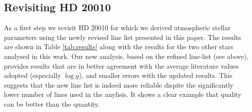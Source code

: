 \documentclass[a4paper,fleqn,usenatbib]{mnras}
\begin{document}
\subsection{Revisiting HD 20010}
\label{sec:hd20010}

As a first step we revisit HD 20010 for which we derived atmospheric stellar parameters 
using the newly revised line list presented in this paper. The results are shown in Table
\ref{tab:results} along with the results for the two other stars analysed in this work. Our
new analysis, based on the refined line-list (see above), provides results that are in better
agreement with the average literature values adopted (especially $\log g$), and smaller errors with
the updated results. This suggests that the new line list is indeed more reliable dispite the significantly 
lower number of lines used in the anylisis. It shows a clear example that quality can be better than the quantity.
\end{document}
